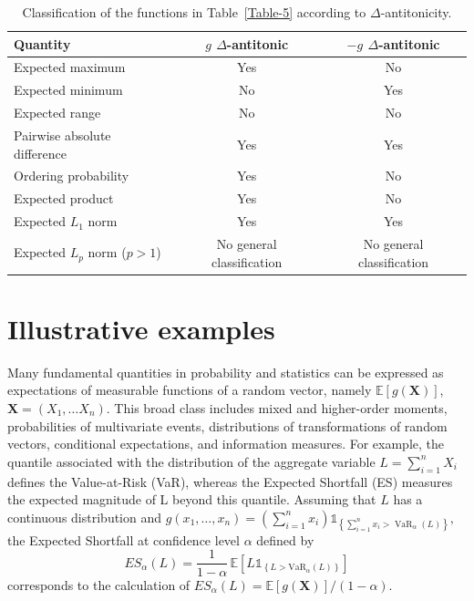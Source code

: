 \documentclass[12pt]{article}
\begin{document}
\begin{table}[H]
	\centering
	\caption{Classification of the functions in Table~\ref{Table-5} according to $\Delta$-antitonicity.}
	\renewcommand{\arraystretch}{1.2}
	\begin{tabular}{lcc}
		\hline
		Quantity &
		$g$ $\Delta$-antitonic &
		$-g$ $\Delta$-antitonic
		\\
		\hline
		
		Expected maximum
		&
		Yes
		&
		No
		\\
		
		Expected minimum
		&
		No
		&
		Yes
		\\
		
		Expected range
		&
		No
		&
		No
		\\
		
		Pairwise absolute difference
		&
		Yes
		&
		Yes
		\\
		
		Ordering probability
		&
		Yes
		&
		No
		\\
		
		Expected product
		&
		Yes
		&
		No
		\\
		
		Expected $L_1$ norm
		&
		Yes
		&
		Yes
		\\
		
		Expected $L_p$ norm ($p>1$)
		&
		No general classification
		&
		No general classification
		\\
		
		\hline
	\end{tabular}
	\label{tab:Delta-antitonic-Table5}
\end{table}






\section{Illustrative examples} \label{sect:4}
Many fundamental quantities in probability and statistics can be expressed as expectations of measurable functions of a random vector, namely $\mathbb{E}[g(\boldsymbol X)]$, $\boldsymbol X=(X_1, \dots X_n)$. This broad class includes mixed and higher-order moments, probabilities of multivariate events, distributions of transformations of random vectors, conditional expectations, and information measures. 
For example, the quantile associated with the distribution of the aggregate variable
$
L=\sum_{i=1}^{n}X_i
$
 defines the Value-at-Risk (VaR), whereas the Expected Shortfall (ES) measures the expected magnitude of L beyond this quantile. 
 Assuming that \(L\) has a continuous distribution and 
$
g(x_1,\ldots,x_n)=
\left(\sum_{i=1}^{n}x_i\right)
\mathds{1}_{\left\{\sum_{i=1}^{n}x_i>
\operatorname{VaR}_{\alpha}(L)\right\}},
$
 the Expected Shortfall at confidence level \(\alpha\)  defined by
\[
ES_{\alpha}(L)=
\frac{1}{1-\alpha} \,
\mathbb{E}\!\left[
L \mathds 1_{\left\{L>\mathrm{VaR}_{\alpha}(L)\right\}}
\right]
\]
corresponds to the calculation of
$
ES_{\alpha}(L)
=
\mathbb{E}[g(\mathbf{X})]/(1-\alpha).
$
 
\end{document}
